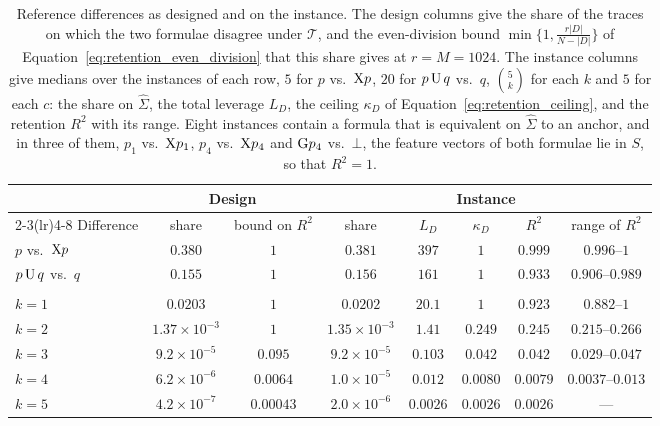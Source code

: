 \documentclass[titlepage,a4paper,11pt]{report}
\begin{document}
    \begin{table}[ht]
        \centering
        \caption{Reference differences as designed and on the instance. The design columns give the share of the traces on which the two formulae disagree under $\mathcal T$, and the even-division bound $\min\{1,\frac{r|D|}{N-|D|}\}$ of Equation~\eqref{eq:retention_even_division} that this share gives at $r=M=1024$. The instance columns give medians over the instances of each row, $5$ for $p$ vs.\ $\text{X} p$, $20$ for $p\,\text{U}\,q$ vs.\ $q$, $\binom5k$ for each $k$ and $5$ for each $c$: the share on $\widehat\Sigma$, the total leverage $L_D$, the ceiling $\kappa_D$ of Equation~\eqref{eq:retention_ceiling}, and the retention $R^2$ with its range. Eight instances contain a formula that is equivalent on $\widehat\Sigma$ to an anchor, and in three of them, $p_1$ vs.\ $\text{X} p_1$, $p_4$ vs.\ $\text{X} p_4$ and $\text{G} p_4$ vs.\ $\bot$, the feature vectors of both formulae lie in $S$, so that $R^2=1$.}
        \label{tab:geom_reference}
        \begin{tabular}{lccccccc}
            \toprule
            & \multicolumn{2}{c}{Design} & \multicolumn{5}{c}{Instance} \\
            \cmidrule(lr){2-3}\cmidrule(lr){4-8}
            Difference & share & bound on $R^2$ & share & $L_D$ & $\kappa_D$ & $R^2$ & range of $R^2$ \\
            \midrule
            $p$ vs.\ $\text{X} p$ & $0.380$ & $1$ & $0.381$ & $397$ & $1$ & $0.999$ & $0.996$--$1$ \\
            $p\,\text{U}\,q$ vs.\ $q$ & $0.155$ & $1$ & $0.156$ & $161$ & $1$ & $0.933$ & $0.906$--$0.989$ \\
            \addlinespace
            \multicolumn{8}{l}{$\G(p_1\land\dots\land p_k)$ vs.\ $\bot$} \\
            \quad $k=1$ & $0.0203$ & $1$ & $0.0202$ & $20.1$ & $1$ & $0.923$ & $0.882$--$1$ \\
            \quad $k=2$ & $1.37\times10^{-3}$ & $1$ & $1.35\times10^{-3}$ & $1.41$ & $0.249$ & $0.245$ & $0.215$--$0.266$ \\
            \quad $k=3$ & $9.2\times10^{-5}$ & $0.095$ & $9.2\times10^{-5}$ & $0.103$ & $0.042$ & $0.042$ & $0.029$--$0.047$ \\
            \quad $k=4$ & $6.2\times10^{-6}$ & $0.0064$ & $1.0\times10^{-5}$ & $0.012$ & $0.0080$ & $0.0079$ & $0.0037$--$0.013$ \\
            \quad $k=5$ & $4.2\times10^{-7}$ & $0.00043$ & $2.0\times10^{-6}$ & $0.0026$ & $0.0026$ & $0.0026$ & --- \\

\end{tabular}
\end{table}
\end{document}
